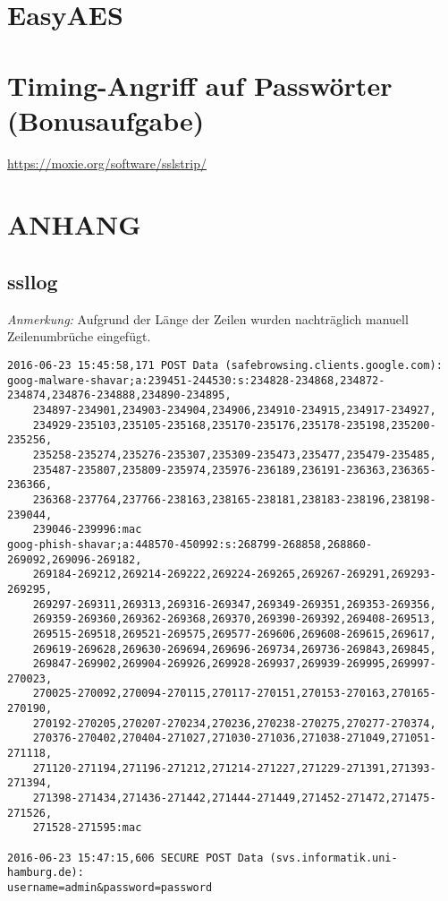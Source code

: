 \documentclass[twoside]{article}
\begin{document}
		
\section{EasyAES}
	\label{sec:easyaes}
	
	
\section{Timing-Angriff auf Passwörter (Bonusaufgabe)}
	\label{sec:timing}
		




\begin{thebibliography}{1}
	\url{https://moxie.org/software/sslstrip/}
\end{thebibliography}

\newpage
\section*{ANHANG}
	\label{sec:anhang}
	\subsection*{ssllog}
		\label{ssllog}
		\textit{Anmerkung:} Aufgrund der Länge der Zeilen wurden nachträglich manuell Zeilenumbrüche eingefügt.
\begin{lstlisting}
2016-06-23 15:45:58,171 POST Data (safebrowsing.clients.google.com):
goog-malware-shavar;a:239451-244530:s:234828-234868,234872-234874,234876-234888,234890-234895,
    234897-234901,234903-234904,234906,234910-234915,234917-234927,
    234929-235103,235105-235168,235170-235176,235178-235198,235200-235256,
    235258-235274,235276-235307,235309-235473,235477,235479-235485,
    235487-235807,235809-235974,235976-236189,236191-236363,236365-236366,
    236368-237764,237766-238163,238165-238181,238183-238196,238198-239044,
    239046-239996:mac
goog-phish-shavar;a:448570-450992:s:268799-268858,268860-269092,269096-269182,
    269184-269212,269214-269222,269224-269265,269267-269291,269293-269295,
    269297-269311,269313,269316-269347,269349-269351,269353-269356,
    269359-269360,269362-269368,269370,269390-269392,269408-269513,
    269515-269518,269521-269575,269577-269606,269608-269615,269617,
    269619-269628,269630-269694,269696-269734,269736-269843,269845,
    269847-269902,269904-269926,269928-269937,269939-269995,269997-270023,
    270025-270092,270094-270115,270117-270151,270153-270163,270165-270190,
    270192-270205,270207-270234,270236,270238-270275,270277-270374,
    270376-270402,270404-271027,271030-271036,271038-271049,271051-271118,
    271120-271194,271196-271212,271214-271227,271229-271391,271393-271394,
    271398-271434,271436-271442,271444-271449,271452-271472,271475-271526,
    271528-271595:mac

2016-06-23 15:47:15,606 SECURE POST Data (svs.informatik.uni-hamburg.de):
username=admin&password=password

\end{lstlisting}
\end{document}
